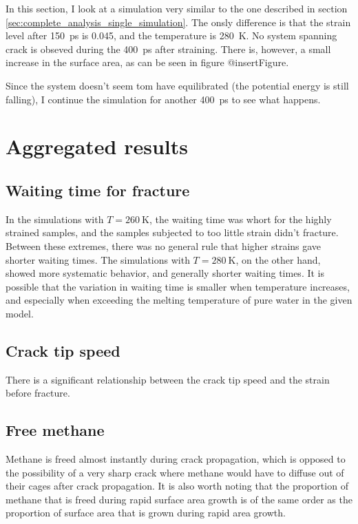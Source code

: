 In this section, I look at a simulation very similar to the one described in section \ref{sec:complete_analysis_single_simulation}. The onsly difference is that the strain level after \SI{150}{\pico\second} is 0.045, and the temperature is \SI{280}{\kelvin}. No system spanning crack is obseved during the \SI{400}{\pico\second} after straining. There is, however, a small increase in the surface area, as can be seen in figure @insertFigure. 

Since the system doesn't seem tom have equilibrated (the potential energy is still falling), I continue the simulation for another \SI{400}{\pico\second} to see what happens.

\section{Aggregated results}

\subsection{Waiting time for fracture}
In the simulations with $T=\SI{260}{\kelvin}$, the waiting time was whort for the highly strained samples, and the samples subjected to too little strain didn't fracture. Between these extremes, there was no general rule that higher strains gave shorter waiting times. The simulations with $T=\SI{280}{\kelvin}$, on the other hand, showed more systematic behavior, and generally shorter waiting times. It is possible that the variation in waiting time is smaller when temperature increases, and especially when exceeding the melting temperature of pure water in the given model.

\subsection{Crack tip speed}
There is a significant relationship between the crack tip speed and the strain before fracture. 

\subsection{Free methane}
Methane is freed almost instantly during crack propagation, which is opposed to the possibility of a very sharp crack where methane would have to diffuse out of their cages after crack propagation. It is also worth noting that the proportion of methane that is freed during rapid surface area growth is of the same order as the proportion of surface area that is grown during rapid area growth.
